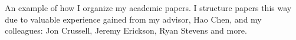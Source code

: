 An example of how I organize my academic papers.
I structure papers this way due to valuable experience gained from my advisor, Hao Chen,
  and my colleagues: Jon Crussell, Jeremy Erickson, Ryan Stevens and more.
